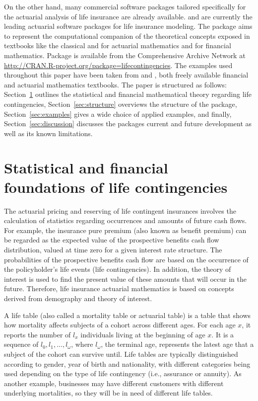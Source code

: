 \documentclass[nojss]{jss}
\begin{document}
On the other hand, many commercial software packages tailored
specifically for the actuarial analysis of life insurance are already
available.  \citep{moses} and 
\citep{prophet} are currently the leading actuarial software packages
for life insurance modeling. The  package aims
to represent the computational  companion of the
theoretical concepts exposed in textbooks like the classical
\cite{bowers1997actuarial} and \cite{dickson2009actuarial} for
actuarial mathematics and \cite{broverman2008mathematics} for
financial mathematics. Package  is available from
the Comprehensive  Archive Network at
\url{http://CRAN.R-project.org/package=lifecontingencies}. The examples used throughout this
paper have been taken from \cite{mathFinAct} and \cite{finanMLC}, both
freely available financial and actuarial mathematics textbooks. The
paper is structured as follows: Section~\ref{sec:statistics} outlines
the statistical and financial mathematical theory regarding life
contingencies, Section~\ref{sec:structure} overviews the structure of
the  package, Section~\ref{sec:examples} gives
a wide choice of applied  examples, and
finally, Section~\ref{sec:discussion} discusses the packages current
and future development as well as its known limitations.


\section[Statistical and financial foundations of life
  contingencies]{Statistical and financial foundations of life
  contingencies}\label{sec:statistics}

The actuarial pricing and reserving of life contingent insurances
involves the calculation of statistics regarding occurrences and
amounts of future cash flows. For example, the insurance pure premium
(also known as benefit premium) can be regarded as the expected value
of the prospective benefits cash flow distribution, valued at time zero
for a given interest rate structure. The probabilities of the
prospective benefits cash flow are based on the occurrence of the
policyholder's life events (life contingencies). In addition, the
theory of interest is used to find the present value of these amounts
that will occur in the future. Therefore, life insurance actuarial
mathematics is based on concepts derived from demography and theory of
interest.

A life table (also called a mortality table or actuarial table) is a
table that shows how mortality affects subjects of a cohort across
different ages. For each age $x$, it reports the number of $l_x$
individuals living at the beginning of age $x$. It is a sequence of
$l_0, l_1, \ldots, l_{\omega}$, where $l_{\omega}$, the terminal age,
represents the latest age that a subject of the cohort can survive
until. Life tables are typically distinguished according to gender,
year of birth and nationality, with different categories being used
depending on the type of life contingency (i.e., assurance or
annuity). As another example, businesses may have different customers
with different underlying mortalities, so they will be in need of
different life tables.
\end{document}
